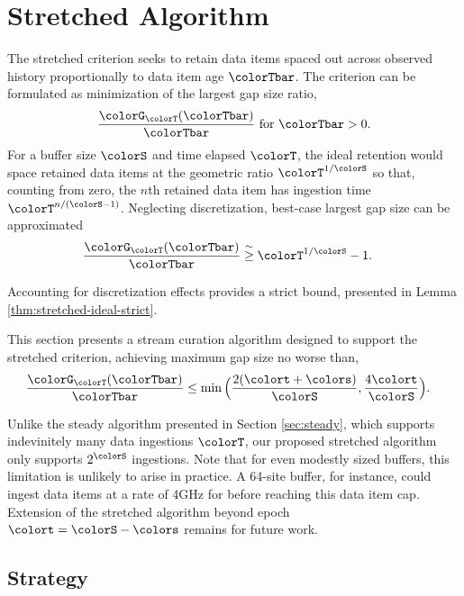 \section{Stretched Algorithm} \label{sec:stretched}

The stretched criterion seeks to retain data items spaced out across observed history proportionally to data item age $\colorTbar$.
The criterion can be formulated as minimization of the largest gap size ratio,
\begin{align*}
\frac{\colorG_{\colorT}(\colorTbar)}{\colorTbar} \text{ for } \colorTbar > 0.
\end{align*}
For a buffer size $\colorS$ and time elapsed $\colorT$, the ideal retention would space retained data items at the geometric ratio $\colorT^{1/\colorS}$ so that, counting from zero, the $n$th retained data item has ingestion time $\colorT^{n/(\colorS - 1)}$.
Neglecting discretization, best-case largest gap size can be approximated
\begin{align*}
\frac{\colorG_{\colorT}(\colorTbar)}{\colorTbar}
&\stackrel{\sim}{\geq}
\colorT^{1/\colorS} - 1.
\end{align*}

Accounting for discretization effects provides a strict bound, presented in Lemma \ref{thm:stretched-ideal-strict}.



This section presents a stream curation algorithm designed to support the stretched criterion, achieving maximum gap size no worse than,
\begin{align*}
\frac{\colorG_{\colorT}(\colorTbar)}{\colorTbar}
&\leq
\min\Big(
  \frac{2(\colort + \colors)}{\colorS},
  \frac{4\colort}{\colorS}
\Big).
\end{align*}

Unlike the steady algorithm presented in Section \ref{sec:steady}, which supports indevinitely many data ingestions $\colorT$, our proposed stretched algorithm only supports $2^{\colorS}$ ingestions.
Note that for even modestly sized buffers, this limitation is unlikely to arise in practice.
A 64-site buffer, for instance, could ingest data items at a rate of 4GHz for before reaching this data item cap.
Extension of the stretched algorithm beyond epoch $\colort = \colorS - \colors$ remains for future work.

\subsection{Strategy}

